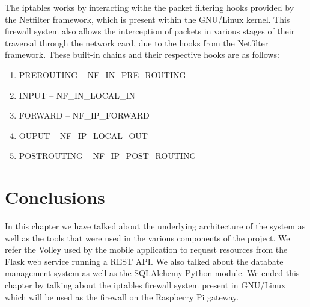 The iptables works by interacting withe the packet filtering hooks provided by
the Netfilter framework, which is present within the GNU/Linux kernel.
This firewall system also allows the interception of packets in various stages
of their traversal through the network card, due to the hooks from the Netfilter
framework. These built-in chains and their
respective hooks are as follows:
\begin{enumerate}
	\item PREROUTING -- NF_IN_PRE_ROUTING
	\item INPUT -- NF_IN_LOCAL_IN
	\item FORWARD -- NF_IP_FORWARD
	\item OUPUT -- NF_IP_LOCAL_OUT
	\item POSTROUTING -- NF_IP_POST_ROUTING
\end{enumerate}

\section{Conclusions}
\label{chap3:sec:concs}
In this chapter we have talked about the underlying architecture of the system
as well as the tools that were used in the various components of the project.
We refer the Volley used by the mobile application to request resources from the
Flask web service running a REST API. We also talked about the databate
management system as well as the SQLAlchemy Python module. We ended this chapter
by talking about the iptables firewall system present in GNU/Linux which will be
used as the firewall on the Raspberry Pi gateway.
